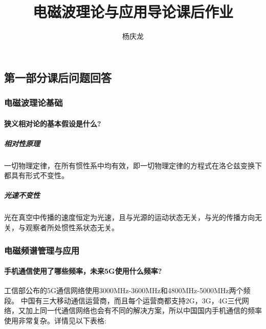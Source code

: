 \documentclass[UTF8]{article}
\begin{document}
\begin{CJK}{UTF8}{gkai}
\title{电磁波理论与应用导论课后作业}
\author{杨庆龙}
\maketitle

\part{第一部分\quad 课后问题回答}
\section{电磁波理论基础}
\subsection{狭义相对论的基本假设是什么?}
\subsubsection{相对性原理}
一切物理定律，在所有惯性系中均有效，即一切物理定律的方程式在洛仑兹变换下都具有形式不变性。
\subsubsection{光速不变性}
光在真空中传播的速度恒定为光速，且与光源的运动状态无关，与光的传播方向无关，与观察者所处惯性系状态无关。
\section{电磁频谱管理与应用}
\subsection{手机通信使用了哪些频率，未来5G使用什么频率?}
工信部公布的5G通信网络使用3000MHz-3600MHz和4800MHz-5000MHz两个频段。
中国有三大移动通信运营商，而且每个运营商都支持2G，3G，4G三代网络，又加上同一代通信网络也会有不同的解决方案，所以中国国内手机通信的频率使用非常复杂。详情见以下表格:


\end{CJK}
\end{document}
